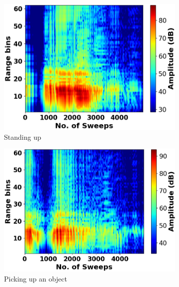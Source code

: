\documentclass{l4proj}
\begin{document}
\begin{figure}[h]
\begin{subfigure}[b]{0.32\textwidth}
        \includegraphics[width=\textwidth]{images/Range-Sweep_3.png}
        \caption{Standing up}
        \label{fig:range-sweep3}
    \end{subfigure}
    \hfill
    \begin{subfigure}[b]{0.32\textwidth}
        \includegraphics[width=\textwidth]{images/Range-Sweep_4.png}
        \caption{Picking up an object}
        \label{fig:range-sweep4}
    \end{subfigure}
    \hfill
    \begin{subfigure}[b]{0.32\textwidth}

\end{subfigure}
\end{figure}
\end{document}
